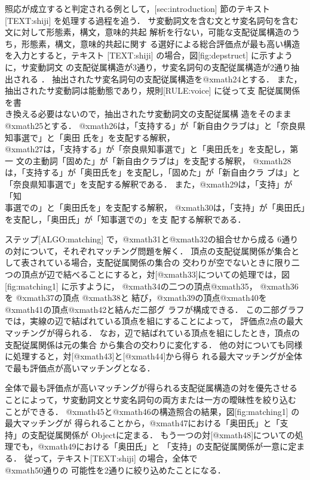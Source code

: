 照応が成立すると判定される例として，[sec:introduction] 節のテキスト
[TEXT:shiji] を処理する過程を追う．
サ変動詞文を含む文とサ変名詞句を含む文に対して形態素，構文，意味的共起
解析を行ない，可能な支配従属構造のうち，形態素，構文，意味的共起に関す
る選好による総合評価点が最も高い構造を入力とすると，テキスト
[TEXT:shiji] の場合，図[fig:depstruct] に示すように，サ変動詞文
の支配従属構造が3通り，サ変名詞句の支配従属構造が2通り抽出される
．
抽出されたサ変名詞句の支配従属構造を@xmath24とする．
また，抽出されたサ変動詞は能動態であり，規則[RULE:voice] に従って支
配従属関係を書\\き換える必要はないので，抽出されたサ変動詞文の支配従属構
造をそのまま@xmath25とする．
@xmath26は，「支持する」が「新自由クラブは」と「奈良県知事選で」と「奥田
氏を」を支配する解釈，\\
@xmath27は，「支持する」が「奈良県知事選で」と「奥田氏を」を支配し，第一
文の主動詞「固めた」が「新自由クラブは」を支配する解釈，
@xmath28は，「支持する」が「奥田氏を」を支配し，「固めた」が「新自由クラ
ブは」と「奈良県知事選で」を支配する解釈である．
また，@xmath29は，「支持」が「知\\事選での」と「奥田氏を」を支配する解釈，
@xmath30は，「支持」が「奥田氏」を支配し，「奥田氏」が「知事選での」を支
配する解釈である．


ステップ[ALGO:matching] で，@xmath31と@xmath32の組合せから成る
6通りの対について，それぞれマッチング問題を解く．
頂点の支配従属関係が集合として表されている場合，支配従属関係の集合の
交わりが空でないときに限り二つの頂点が辺で結べることにすると，対[@xmath33]についての処理では，図[fig:matching1] に示すように，
@xmath34の二つの頂点@xmath35，
@xmath36を
@xmath37の頂点
@xmath38と
結び，@xmath39の頂点@xmath40を
@xmath41の頂点@xmath42と結んだ二部グ
ラフが構成できる．
この二部グラフでは，実線の辺で結ばれている頂点を組にすることによって，
評価点2点の最大マッチングが得られる．
なお，辺で結ばれている頂点を組にしたとき，頂点の支配従属関係は元の集合
から集合の交わりに変化する．
他の対についても同様に処理すると，対[@xmath43]と[@xmath44]から得ら
れる最大マッチングが全体で最も評価点が高いマッチングとなる．


全体で最も評価点が高いマッチングが得られる支配従属構造の対を優先させる
ことによって，サ変動詞文とサ変名詞句の両方または一方の曖昧性を絞り込む
ことができる．
@xmath45と@xmath46の構造照合の結果，図[fig:matching1] の最大マッチングが
得られることから，@xmath47における「奥田氏」と「支\\持」の支配従属関係が
Objectに定まる．
もう一つの対[@xmath48]についての処理でも，@xmath49における「奥田氏」と
「支持」の支配従属関係が一意に定まる．
従って，テキスト[TEXT:shiji] の場合，全体で\\@xmath50通りの
可能性を2通りに絞り込めたことになる．

